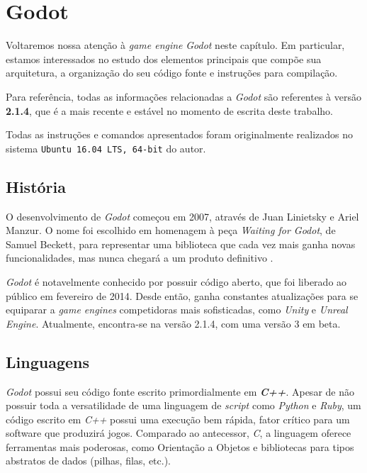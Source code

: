 \chapter{Godot}
\label{cap:godot}

Voltaremos nossa atenção à \textit{game engine} \textit{Godot} neste capítulo. Em particular, estamos interessados no estudo dos elementos principais que compõe sua arquitetura, a organização do seu código fonte e instruções para compilação.

Para referência, todas as informações relacionadas a \textit{Godot} são referentes à versão \textbf{2.1.4}, que é a mais recente e estável no momento de escrita deste trabalho.

Todas as instruções e comandos apresentados foram originalmente realizados no sistema \texttt{Ubuntu 16.04 LTS, 64-bit} do autor.


\section{História}

O desenvolvimento de \textit{Godot} começou em 2007, através de Juan Linietsky e Ariel Manzur. O nome foi escolhido em homenagem à peça \emph{Waiting for Godot}, de Samuel Beckett, para representar uma biblioteca que cada vez mais ganha novas funcionalidades, mas nunca chegará a um produto definitivo \citep{godotHistory}.

\textit{Godot} é notavelmente conhecido por possuir código aberto, que foi liberado ao público em fevereiro de 2014. Desde então, ganha constantes atualizações para se equiparar a \textit{game engines} competidoras mais sofisticadas, como \textit{Unity} e \textit{Unreal Engine}. Atualmente, encontra-se na versão 2.1.4, com uma versão 3 em beta.


\section{Linguagens}

\textit{Godot} possui seu código fonte escrito primordialmente em \textbf{\textit{C++}}. Apesar de não possuir toda a versatilidade de uma linguagem de \textit{script} como \textit{Python} e \textit{Ruby}, um código escrito em \textit{C++} possui uma execução bem rápida, fator crítico para um software que produzirá jogos. Comparado ao antecessor, \textit{C}, a linguagem oferece ferramentas mais poderosas, como Orientação a Objetos e bibliotecas para tipos abstratos de dados (pilhas, filas, etc.).

